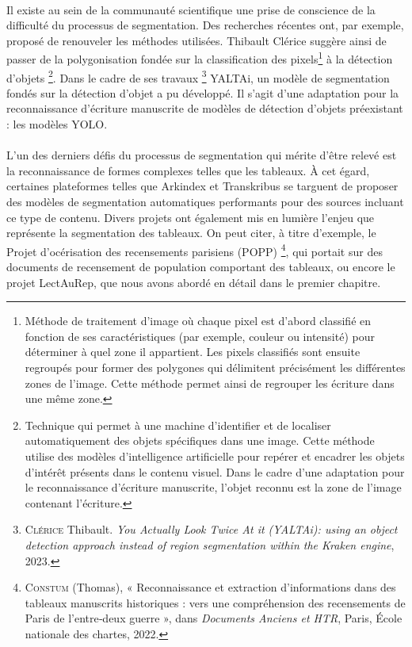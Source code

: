 \documentclass[a4paper,12pt,twoside]{book}
\begin{document}
\paragraph{}
Il existe au sein de la communauté scientifique une prise de conscience de la difficulté du processus de segmentation. Des recherches récentes ont, par exemple, proposé de renouveler les méthodes utilisées. Thibault Clérice suggère ainsi de passer de la polygonisation fondée sur la classification des pixels\footnote{Méthode de traitement d'image où chaque pixel est d'abord classifié en fonction de ses caractéristiques (par exemple, couleur ou intensité) pour déterminer à quel zone il appartient. Les pixels classifiés sont ensuite regroupés pour former des polygones qui délimitent précisément les différentes zones de l'image. Cette méthode permet ainsi de regrouper les écriture dans une même zone.} à la détection d'objets \footnote{Technique qui permet à une machine d'identifier et de localiser automatiquement des objets spécifiques dans une image. Cette méthode utilise des modèles d'intelligence artificielle pour repérer et encadrer les objets d'intérêt présents dans le contenu visuel. Dans le cadre d'une adaptation pour le reconnaissance d'écriture manuscrite, l'objet reconnu est la zone de l'image contenant l'écriture.}. Dans le cadre de ses travaux \footnote{\textsc{Clérice} Thibault. \textit{You Actually Look Twice At it (YALTAi): using an object detection approach instead of region segmentation within the Kraken engine}, 2023.} YALTAi, un modèle de segmentation fondés sur la détection d'objet a pu développé. Il s'agit d'une adaptation pour la reconnaissance d'écriture manuscrite de modèles de détection d'objets préexistant : les modèles YOLO.     

\paragraph{}
L'un des derniers défis du processus de segmentation qui mérite d'être relevé est la reconnaissance de formes complexes telles que les tableaux. À cet égard, certaines plateformes telles que Arkindex et Transkribus se targuent de proposer des modèles de segmentation automatiques performants pour des sources incluant ce type de contenu. Divers projets ont également mis en lumière l'enjeu que représente la segmentation des tableaux. On peut citer, à titre d'exemple, le Projet d'océrisation des recensements parisiens (POPP) \footnote{\textsc{Constum} (Thomas), « Reconnaissance et extraction d’informations dans des tableaux manuscrits historiques : vers une compréhension des recensements de Paris de l’entre‑deux guerre », dans \textit{Documents Anciens et HTR}, Paris, École nationale des chartes, 2022.}, qui portait sur des documents de recensement de population comportant des tableaux, ou encore le projet LectAuRep, que nous avons abordé en détail dans le premier chapitre.
\end{document}
